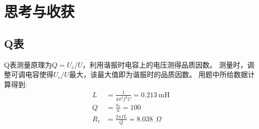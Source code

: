 \documentclass{ctexart}
\newcommand\ohm{\ \Omega}
\begin{document}
    \newpage

    \section{思考与收获}
    \subsection{Q表}
    Q表测量原理为$Q = U_c / U$，利用谐振时电容上的电压测得品质因数。
    测量时，调整可调电容使得$U_c / U$最大，该最大值即为谐振时的品质因数。
    用题中所给数据计算得到:
    \begin{align}
        L &= \frac{1}{4\pi^2 f^2 C} = 0.213 \ \mathrm{mH}\\
        Q &= \frac{u_c}{u} = 100 \\
        R_r &= \frac{2\pi f L}{Q} = 8.038 \ \ohm\\
    \end{align}
\end{document}
